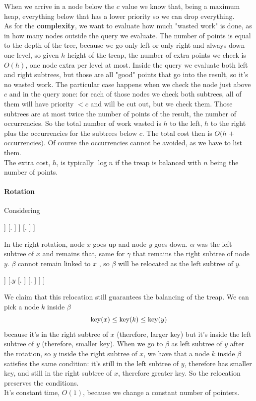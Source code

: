 \documentclass[10pt]{report}
\newcommand*\triangled[1]{\tikz[baseline=(char.base)]{
            \node[regular polygon, regular polygon sides=3,draw,inner sep=1pt] (char) {#1};}}
\begin{document}
When we arrive in a node below the $c$ value we know that, being a maximum heap, everything below that has a lower priority so we can drop everything.\\
As for the \textbf{complexity}, we want to evaluate how much "wasted work" is done, as in how many nodes outside the query we evaluate. The number of points is equal to the depth of the tree, because we go only left or only right and always down one level, so given $h$ height of the treap, the number of extra points we check is $O(h)$, one node extra per level at most. Inside the query we evaluate both left and right subtrees, but those are all "good" points that go into the result, so it's no wasted work. The particular case happens when we check the node just above $c$ and in the query zone: for each of those nodes we check both subtrees, all of them will have priority $< c$ and will be cut out, but we check them. Those subtrees are at most twice the number of points of the result, the number of occurrencies. So the total number of work wasted is $h$ to the left, $h$ to the right plus the occurrencies for the subtrees below $c$. The total cost then is $O(h$ $+$ occurrencies$)$. Of course the occurrencies cannot be avoided, as we have to list them.\\
The extra cost, $h$, is typically $\log n$ if the treap is balanced with $n$ being the number of points.
\paragraph{Rotation} Considering 
\begin{center}
\Tree [.$y$ [.$x$ [.\triangled{$\alpha$} ] [.\triangled{$\beta$} ] ] [.\triangled{$\gamma$} ] ]
\end{center}
In the right rotation, node $x$ goes up and node $y$ goes down. $\alpha$ was the left subtree of $x$ and remains that, same for $\gamma$ that remains the right subtree of node $y$. $\beta$ cannot remain linked to $x$ , so $\beta$ will be relocated as the left subtree of $y$.
\begin{center}
\Tree [.$x$ [.\triangled{$\alpha$} ] [.$y$ [.\triangled{$\beta$} ] [.\triangled{$\gamma$} ] ] ]
\end{center}
We claim that this relocation still guarantees the balancing of the treap. We can pick a node $k$ inside $\beta$
$$\hbox{key}(x) \leq \hbox{key}(k) \leq \hbox{key}(y)$$
because it's in the right subtree of $x$ (therefore, larger key) but it's inside the left subtree of $y$ (therefore, smaller key). When we go to $\beta$ as left subtree of $y$ after the rotation, so $y$ inside the right subtree of $x$, we have that a node $k$ inside $\beta$ satisfies the same condition: it's still in the left subtree of $y$, therefore has smaller key, and still in the right subtree of $x$, therefore greater key. So the relocation preserves the conditions.\\
It's constant time, $O(1)$, because we change a constant number of pointers.
\end{document}
